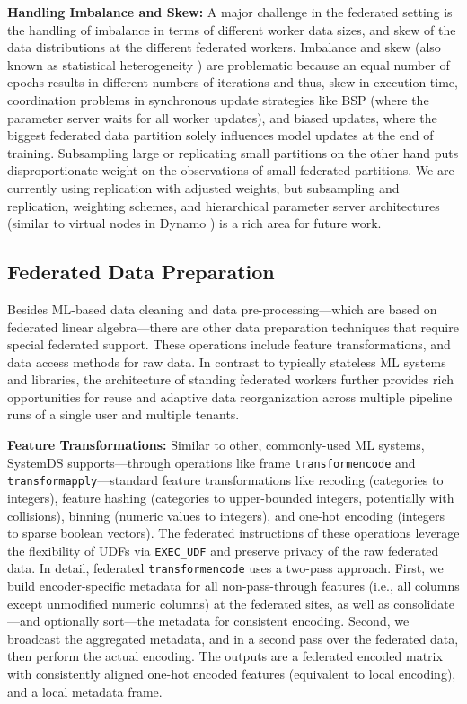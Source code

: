 \documentclass[sigconf,screen]{acmart}
\begin{document}
\textbf{Handling Imbalance and Skew:} A major challenge in the federated setting is the handling of imbalance in terms of different worker data sizes, and skew of the data distributions at the different federated workers. Imbalance and skew (also known as statistical heterogeneity \cite{LiSTS20,Smith20}) are problematic because an equal number of epochs results in different numbers of iterations and thus, skew in execution time, coordination problems in synchronous update strategies like BSP (where the parameter server waits for all worker updates), and biased updates, where the biggest federated data partition solely influences model updates at the end of training. Subsampling large or replicating small partitions on the other hand puts disproportionate weight on the observations of small federated partitions. We are currently using replication with adjusted weights, but subsampling and replication, weighting schemes, and hierarchical parameter server architectures (similar to virtual nodes in Dynamo \cite{DeCandiaHJKLPSVV07}) is a rich area for future work.

\subsection{Federated Data Preparation}
\label{sec:dataprep}

Besides ML-based data cleaning and data pre-processing---which are based on federated linear algebra---there are other data preparation techniques that require special federated support. These operations include feature transformations, and data access methods for raw data. In contrast to typically stateless ML systems and libraries, the architecture of standing federated workers further provides rich opportunities for reuse and adaptive data reorganization across multiple pipeline runs of a single user and multiple tenants.

\textbf{Feature Transformations:} Similar to other, commonly-used ML systems, SystemDS supports---through operations like frame \texttt{transformencode} and \texttt{transformapply}---standard feature transformations like recoding (categories to integers), feature hashing (categories to upper-bounded integers, potentially with collisions), binning (numeric values to integers), and one-hot encoding (integers to sparse boolean vectors). The federated instructions of these operations leverage the flexibility of UDFs via \texttt{EXEC\_UDF} and preserve privacy of the raw federated data. In detail, federated \texttt{transformencode} uses a two-pass approach. First, we build encoder-specific metadata for all non-pass-through features (i.e., all columns except unmodified numeric columns) at the federated sites, as well as consolidate---and optionally sort---the metadata for consistent encoding. Second, we broadcast the aggregated metadata, and in a second pass over the federated data, then perform the actual encoding. The outputs are a federated encoded matrix with consistently aligned one-hot encoded features (equivalent to local encoding), and a local metadata frame.
\end{document}
